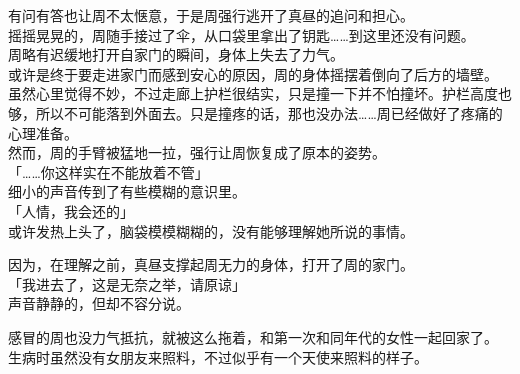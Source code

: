 有问有答也让周不太惬意，于是周强行逃开了真昼的追问和担心。\\

摇摇晃晃的，周随手接过了伞，从口袋里拿出了钥匙……到这里还没有问题。\\

周略有迟缓地打开自家门的瞬间，身体上失去了力气。\\

或许是终于要走进家门而感到安心的原因，周的身体摇摆着倒向了后方的墙壁。\\

虽然心里觉得不妙，不过走廊上护栏很结实，只是撞一下并不怕撞坏。护栏高度也够，所以不可能落到外面去。只是撞疼的话，那也没办法……周已经做好了疼痛的心理准备。\\

然而，周的手臂被猛地一拉，强行让周恢复成了原本的姿势。\\

「……你这样实在不能放着不管」\\

细小的声音传到了有些模糊的意识里。\\

「人情，我会还的」\\

或许发热上头了，脑袋模模糊糊的，没有能够理解她所说的事情。

因为，在理解之前，真昼支撑起周无力的身体，打开了周的家门。\\

「我进去了，这是无奈之举，请原谅」\\

声音静静的，但却不容分说。

感冒的周也没力气抵抗，就被这么拖着，和第一次和同年代的女性一起回家了。\\

生病时虽然没有女朋友来照料，不过似乎有一个天使来照料的样子。
